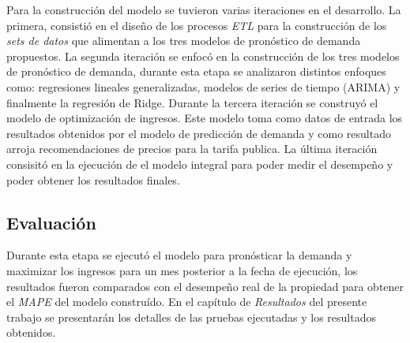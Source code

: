 Para la construcción del modelo se tuvieron varias iteraciones en el desarrollo. La primera, consistió en el diseño de los procesos \emph{ETL} para la construcción de los \emph{sets de datos} que alimentan a los tres modelos de pronóstico de demanda propuestos. La segunda iteración se enfocó en la construcción de los tres modelos de pronóstico de demanda, durante esta etapa se analizaron distintos enfoques como: regresiones lineales generalizadas, modelos de series de tiempo (ARIMA) y finalmente la regresión de Ridge. Durante la tercera iteración se construyó el modelo de optimización de ingresos. Este modelo toma como datos de entrada los resultados obtenidos por el modelo de predicción de demanda y como resultado arroja recomendaciones de precios para la tarifa publica. La última iteración consisitó en la ejecución de el modelo integral para poder medir el desempeño y poder obtener los resultados finales.

\subsection*{Evaluación}

Durante esta etapa se ejecutó el modelo para pronósticar la demanda y maximizar los ingresos para un mes posterior a la fecha de ejecución, los resultados fueron comparados con el desempeño real de la propiedad para obtener el \emph{MAPE} del modelo construído. En el capítulo de \emph{Resultados} del presente trabajo se presentarán los detalles de las pruebas ejecutadas y los resultados obtenidos.
